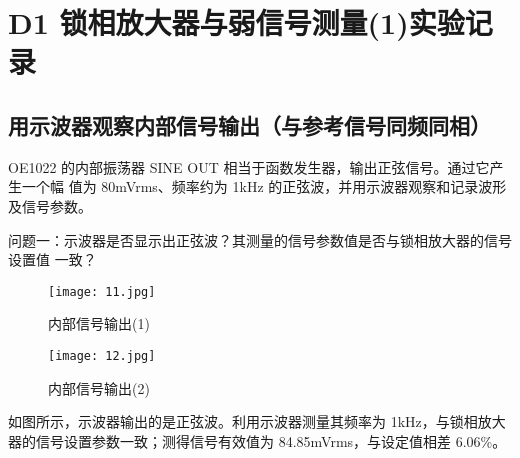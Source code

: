 \documentclass[dvipsnames, svgnames,a4paper,11pt]{article}
\begin{document}
	\section{ D1 锁相放大器与弱信号测量(1)\quad\heiti 实验记录}
	
	\subsection{用示波器观察内部信号输出（与参考信号同频同相）}
	OE1022 的内部振荡器 SINE OUT 相当于函数发生器，输出正弦信号。通过它产生一个幅
值为 80mVrms、频率约为 1kHz 的正弦波，并用示波器观察和记录波形及信号参数。

\begin{question}
		问题一：示波器是否显示出正弦波？其测量的信号参数值是否与锁相放大器的信号设置值
一致？
\end{question}


\begin{figure}[H]
    \begin{minipage}[b]{0.45\linewidth}
      \centering
      \texttt{[image: 11.jpg]} %
      \caption{内部信号输出(1)}
    \end{minipage}
    \hfill
    \begin{minipage}[b]{0.45\linewidth}
      \centering
      \texttt{[image: 12.jpg]} %
      \caption{内部信号输出(2)}
    \end{minipage}
\end{figure}

如图所示，示波器输出的是正弦波。利用示波器测量其频率为 1kHz，与锁相放大器的信号设置参数一致；测得信号有效值为 84.85mVrms，与设定值相差 6.06\%。
\end{document}
